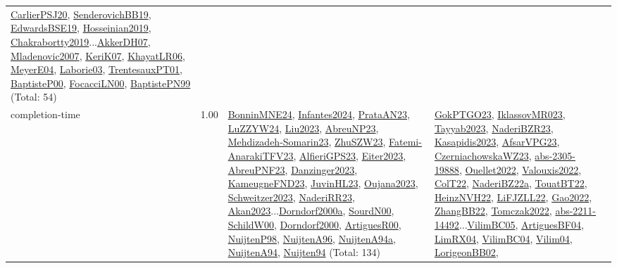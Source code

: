 {\begin{longtable}{p{3cm}r>{\raggedright\arraybackslash}p{6cm}>{\raggedright\arraybackslash}p{6cm}>{\raggedright\arraybackslash}p{8cm}}
\hyperref[detail:CarlierPSJ20]{CarlierPSJ20}, \hyperref[detail:SenderovichBB19]{SenderovichBB19}, \hyperref[detail:EdwardsBSE19]{EdwardsBSE19}, \hyperref[detail:Hosseinian2019]{Hosseinian2019}, \hyperref[detail:Chakrabortty2019]{Chakrabortty2019}...\hyperref[detail:AkkerDH07]{AkkerDH07}, \hyperref[detail:Mladenovic2007]{Mladenovic2007}, \hyperref[detail:KeriK07]{KeriK07}, \hyperref[detail:KhayatLR06]{KhayatLR06}, \hyperref[detail:MeyerE04]{MeyerE04}, \hyperref[detail:Laborie03]{Laborie03}, \hyperref[detail:TrentesauxPT01]{TrentesauxPT01}, \hyperref[detail:BaptisteP00]{BaptisteP00}, \hyperref[detail:FocacciLN00]{FocacciLN00}, \hyperref[detail:BaptistePN99]{BaptistePN99} (Total: 54)\\
\index{completion-time}\index{Concepts!completion-time}completion-time &  1.00 & \hyperref[detail:BonninMNE24]{BonninMNE24}, \hyperref[detail:Infantes2024]{Infantes2024}, \hyperref[detail:PrataAN23]{PrataAN23}, \hyperref[detail:LuZZYW24]{LuZZYW24}, \hyperref[detail:Liu2023]{Liu2023}, \hyperref[detail:AbreuNP23]{AbreuNP23}, \hyperref[detail:Mehdizadeh-Somarin23]{Mehdizadeh-Somarin23}, \hyperref[detail:ZhuSZW23]{ZhuSZW23}, \hyperref[detail:Fatemi-AnarakiTFV23]{Fatemi-AnarakiTFV23}, \hyperref[detail:AlfieriGPS23]{AlfieriGPS23}, \hyperref[detail:Eiter2023]{Eiter2023}, \hyperref[detail:AbreuPNF23]{AbreuPNF23}, \hyperref[detail:Danzinger2023]{Danzinger2023}, \hyperref[detail:KameugneFND23]{KameugneFND23}, \hyperref[detail:JuvinHL23]{JuvinHL23}, \hyperref[detail:Oujana2023]{Oujana2023}, \hyperref[detail:Schweitzer2023]{Schweitzer2023}, \hyperref[detail:NaderiRR23]{NaderiRR23}, \hyperref[detail:Akan2023]{Akan2023}...\hyperref[detail:Dorndorf2000a]{Dorndorf2000a}, \hyperref[detail:SourdN00]{SourdN00}, \hyperref[detail:SchildW00]{SchildW00}, \hyperref[detail:Dorndorf2000]{Dorndorf2000}, \hyperref[detail:ArtiguesR00]{ArtiguesR00}, \hyperref[detail:NuijtenP98]{NuijtenP98}, \hyperref[detail:NuijtenA96]{NuijtenA96}, \hyperref[detail:NuijtenA94a]{NuijtenA94a}, \hyperref[detail:NuijtenA94]{NuijtenA94}, \hyperref[detail:Nuijten94]{Nuijten94} (Total: 134) & \hyperref[detail:GokPTGO23]{GokPTGO23}, \hyperref[detail:IklassovMR023]{IklassovMR023}, \hyperref[detail:Tayyab2023]{Tayyab2023}, \hyperref[detail:NaderiBZR23]{NaderiBZR23}, \hyperref[detail:Kasapidis2023]{Kasapidis2023}, \hyperref[detail:AfsarVPG23]{AfsarVPG23}, \hyperref[detail:CzerniachowskaWZ23]{CzerniachowskaWZ23}, \hyperref[detail:abs-2305-19888]{abs-2305-19888}, \hyperref[detail:Ouellet2022]{Ouellet2022}, \hyperref[detail:Valouxis2022]{Valouxis2022}, \hyperref[detail:ColT22]{ColT22}, \hyperref[detail:NaderiBZ22a]{NaderiBZ22a}, \hyperref[detail:TouatBT22]{TouatBT22}, \hyperref[detail:HeinzNVH22]{HeinzNVH22}, \hyperref[detail:LiFJZLL22]{LiFJZLL22}, \hyperref[detail:Gao2022]{Gao2022}, \hyperref[detail:ZhangBB22]{ZhangBB22}, \hyperref[detail:Tomczak2022]{Tomczak2022}, \hyperref[detail:abs-2211-14492]{abs-2211-14492}...\hyperref[detail:VilimBC05]{VilimBC05}, \hyperref[detail:ArtiguesBF04]{ArtiguesBF04}, \hyperref[detail:LimRX04]{LimRX04}, \hyperref[detail:VilimBC04]{VilimBC04}, \hyperref[detail:Vilim04]{Vilim04}, \hyperref[detail:LorigeonBB02]{LorigeonBB02}, 
\end{longtable}}
